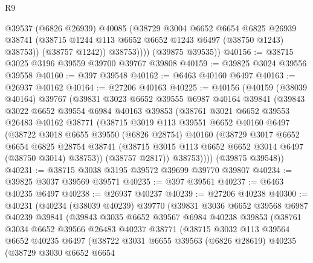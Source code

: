 \begin{lexlean}{R9}
\begin{coremodule}
                @39537
                (@6826 @26939)
                @40085
                (@38729
                  @3004
                  @6652
                  @6654
                  @6825
                  @26939
                  @38741
                  (@38715 @1244 @113 @6652 @6652 @1243 @6497 (@38750 @1243) @38753))
                (@38757 @1242))
              @38753))))
      (@39875 @39535))
@40156 := @38715 @3025 @3196 @39559 @39700 @39767 @39808
@40159 := @39825 @3024 @39556 @39558
@40160 := @397 @39548
@40162 := @6463 @40160 @6497
@40163 := @26937 @40162
@40164 := @27206 @40163
@40225 := @40156
    (@40159
      (@38039 @40164)
      @39767
      (@39831
        @3023
        @6652
        @39555
        @6987
        @40164
        @39841
        (@39843
          @3022
          @6652
          @39554
          @6984
          @40163
          @39853
          (@38761
            @3021
            @6652
            @39553
            @26483
            @40162
            @38771
            (@38715
              @3019
              @113
              @39551
              @6652
              @40160
              @6497
              (@38722
                @3018
                @6655
                @39550
                (@6826 @28754)
                @40160
                (@38729
                  @3017
                  @6652
                  @6654
                  @6825
                  @28754
                  @38741
                  (@38715 @3015 @113 @6652 @6652 @3014 @6497 (@38750 @3014) @38753))
                (@38757 @2817))
              @38753))))
      (@39875 @39548))
@40231 := @38715 @3038 @3195 @39572 @39699 @39770 @39807
@40234 := @39825 @3037 @39569 @39571
@40235 := @397 @39561
@40237 := @6463 @40235 @6497
@40238 := @26937 @40237
@40239 := @27206 @40238
@40300 := @40231
    (@40234
      (@38039 @40239)
      @39770
      (@39831
        @3036
        @6652
        @39568
        @6987
        @40239
        @39841
        (@39843
          @3035
          @6652
          @39567
          @6984
          @40238
          @39853
          (@38761
            @3034
            @6652
            @39566
            @26483
            @40237
            @38771
            (@38715
              @3032
              @113
              @39564
              @6652
              @40235
              @6497
              (@38722
                @3031
                @6655
                @39563
                (@6826 @28619)
                @40235
                (@38729
                  @3030
                  @6652
                  @6654

\end{coremodule}
\end{lexlean}
